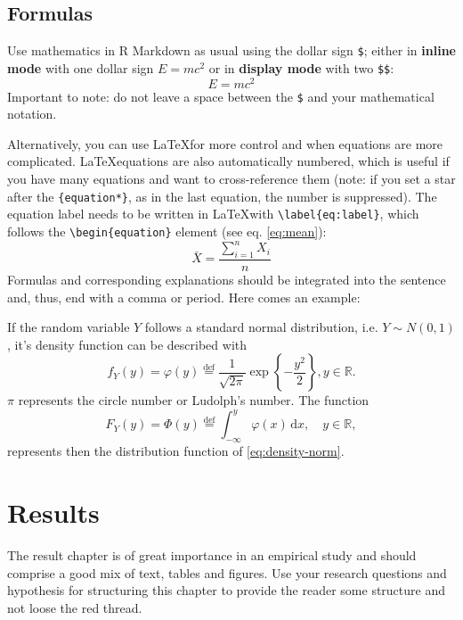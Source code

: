 \documentclass[a4paper,12pt]{article}
\begin{document}
\hypertarget{formulas}{%
\subsection{Formulas}\label{formulas}}

Use mathematics in R Markdown as usual using the dollar sign \texttt{\$}; either in \textbf{inline mode} with one dollar sign \(E = mc^2\) or in \textbf{display mode} with two \texttt{\$\$}: \[E = mc^2\]
Important to note: do not leave a space between the \texttt{\$} and your mathematical notation.

Alternatively, you can use \LaTeX for more control and when equations are more complicated. \LaTeX equations are also automatically numbered, which is useful if you have many equations and want to cross-reference them (note: if you set a star after the \texttt{\{equation*\}}, as in the last equation, the number is suppressed). The equation label needs to be written in \LaTeX with \texttt{\textbackslash{}label\{eq:label\}}, which follows the \texttt{\textbackslash{}begin\{equation\}} element (see eq. \eqref{eq:mean}):
\begin{equation} \label{eq:mean}
  \bar{X} = \frac{\sum_{i=1}^n X_i}{n} 
\end{equation}
Formulas and corresponding explanations should be integrated into the sentence and, thus, end with a comma or period. Here comes an example:

If the random variable \(Y\) follows a standard normal distribution, i.e. \(Y \sim N(0,1)\), it's density function can be described with
\begin{equation} \label{eq:density-norm}
  f_{Y}(y)=\varphi(y) \stackrel{\mathrm{def}}{=} \frac{1}{\sqrt{2 \pi}} \exp \left\{ -\frac{y^2}{2} \right\}, y \in \mathbb{R}.
\end{equation}
\(\pi\) represents the circle number or Ludolph's number. The function
\begin{equation*}
  F_{Y}(y) = \Phi(y) \stackrel{\mathrm{def}}{=} \int_{-\infty}^y \varphi(x) \,\mathrm{d}x, \quad y \in \mathbb{R},
\end{equation*}
represents then the distribution function of \eqref{eq:density-norm}.

\hypertarget{results}{%
\section{Results}\label{results}}

The result chapter is of great importance in an empirical study and should comprise a good mix of text, tables and figures. Use your research questions and hypothesis for structuring this chapter to provide the reader some structure and not loose the red thread.
\end{document}
